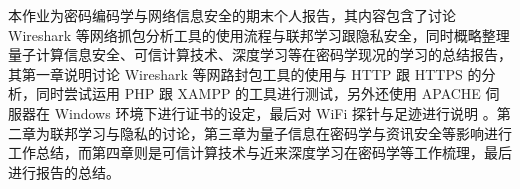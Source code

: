 \begin{cabstract}

本作业为密码编码学与网络信息安全的期末个人报告，其内容包含了讨论 Wireshark 等网络抓包分析工具的使用流程与联邦学习跟隐私安全，同时概略整理量子计算信息安全、可信计算技术、深度学习等在密码学现况的学习的总结报告，其第一章说明讨论 Wireshark 等网路封包工具的使用与 HTTP 跟 HTTPS 的分析，同时尝试运用 PHP 跟 XAMPP 的工具进行测试，另外还使用 APACHE 伺服器在 Windows 环境下进行证书的设定，最后对 WiFi 探针与足迹进行说明 。第二章为联邦学习与隐私的讨论，第三章为量子信息在密码学与资讯安全等影响进行工作总结，而第四章则是可信计算技术与近来深度学习在密码学等工作梳理，最后进行报告的总结。

\end{cabstract}


